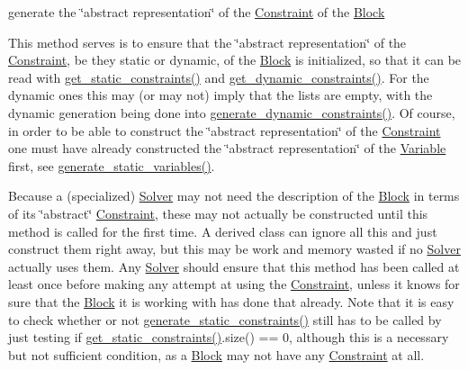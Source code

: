 generate the \char`\"{}abstract representation\char`\"{} of the \mbox{\hyperlink{class_s_m_spp__di__unipi__it_1_1_constraint}{Constraint}} of the \mbox{\hyperlink{class_s_m_spp__di__unipi__it_1_1_block}{Block}} 

This method serves is to ensure that the \char`\"{}abstract representation\char`\"{} of the \mbox{\hyperlink{class_s_m_spp__di__unipi__it_1_1_constraint}{Constraint}}, be they static or dynamic, of the \mbox{\hyperlink{class_s_m_spp__di__unipi__it_1_1_block}{Block}} is initialized, so that it can be read with \mbox{\hyperlink{class_s_m_spp__di__unipi__it_1_1_block_afaf2dca465cd70d9d76bcfe839e52aec}{get\+\_\+static\+\_\+constraints()}} and \mbox{\hyperlink{class_s_m_spp__di__unipi__it_1_1_block_a3f409f4fea9571956a95359dbeef7395}{get\+\_\+dynamic\+\_\+constraints()}}. For the dynamic ones this may (or may not) imply that the lists are empty, with the dynamic generation being done into \mbox{\hyperlink{class_s_m_spp__di__unipi__it_1_1_block_a306892932ce912f30548f3f3e4072e9b}{generate\+\_\+dynamic\+\_\+constraints()}}. Of course, in order to be able to construct the \char`\"{}abstract representation\char`\"{} of the \mbox{\hyperlink{class_s_m_spp__di__unipi__it_1_1_constraint}{Constraint}} one must have already constructed the \char`\"{}abstract representation\char`\"{} of the \mbox{\hyperlink{class_s_m_spp__di__unipi__it_1_1_variable}{Variable}} first, see \mbox{\hyperlink{class_s_m_spp__di__unipi__it_1_1_block_acd79fd0980af547f2f06241cb989094e}{generate\+\_\+static\+\_\+variables()}}.

Because a (specialized) \mbox{\hyperlink{class_s_m_spp__di__unipi__it_1_1_solver}{Solver}} may not need the description of the \mbox{\hyperlink{class_s_m_spp__di__unipi__it_1_1_block}{Block}} in terms of its \char`\"{}abstract\char`\"{} \mbox{\hyperlink{class_s_m_spp__di__unipi__it_1_1_constraint}{Constraint}}, these may not actually be constructed until this method is called for the first time. A derived class can ignore all this and just construct them right away, but this may be work and memory wasted if no \mbox{\hyperlink{class_s_m_spp__di__unipi__it_1_1_solver}{Solver}} actually uses them. Any \mbox{\hyperlink{class_s_m_spp__di__unipi__it_1_1_solver}{Solver}} should ensure that this method has been called at least once before making any attempt at using the \mbox{\hyperlink{class_s_m_spp__di__unipi__it_1_1_constraint}{Constraint}}, unless it knows for sure that the \mbox{\hyperlink{class_s_m_spp__di__unipi__it_1_1_block}{Block}} it is working with has done that already. Note that it is easy to check whether or not \mbox{\hyperlink{class_s_m_spp__di__unipi__it_1_1_block_add9b4c918157bda66b5183f67953d49b}{generate\+\_\+static\+\_\+constraints()}} still has to be called by just testing if \mbox{\hyperlink{class_s_m_spp__di__unipi__it_1_1_block_afaf2dca465cd70d9d76bcfe839e52aec}{get\+\_\+static\+\_\+constraints()}}.size() == 0, although this is a necessary but not sufficient condition, as a \mbox{\hyperlink{class_s_m_spp__di__unipi__it_1_1_block}{Block}} may not have any \mbox{\hyperlink{class_s_m_spp__di__unipi__it_1_1_constraint}{Constraint}} at all.

